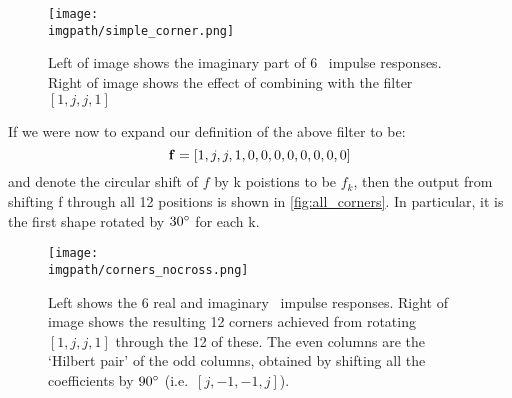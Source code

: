 \begin{figure}[!h]
  \centering
  \texttt{[image: \\imgpath/simple\_corner.png]}
  \caption{Left of image shows the imaginary part of 6 \DTCWT\ impulse responses. Right of image
           shows the effect of combining with the filter $\left[1, j, j,
           1\right]$}
  \label{fig:one_corner}
\end{figure}

If we were now to expand our definition of the above filter to be:
\begin{equation}
  \mathbf{f} = [1, j, j, 1, 0, 0, 0, 0, 0, 0, 0, 0]
\end{equation}
and denote the circular shift of $f$ by k poistions to be $f_k$, then the
output from shifting f through all 12 positions is shown in
\autoref{fig:all_corners}. In particular, it is the first shape rotated by
$30^{\circ}$ for each k.

\begin{figure}[!h]
  \centering
  \texttt{[image: \\imgpath/corners\_nocross.png]}
  \caption{Left shows the 6 real and imaginary \DTCWT\ impulse responses.
  Right of image shows the resulting 12 corners achieved from rotating
  $\left[1, j, j, 1\right]$ through the 12 of these. The even columns are the
  `Hilbert pair' of the odd columns, obtained by shifting all the
  coefficients by $90^{\circ}$ (i.e.\ $\left[j,-1,-1,j\right]$).}
  \label{fig:all_corners}
\end{figure}
  


